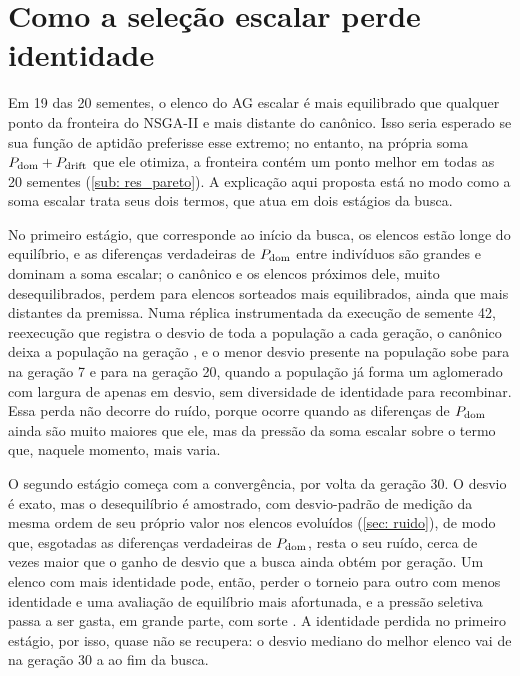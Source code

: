 \section{Como a seleção escalar perde identidade}
\label{sec: disc_ruido}

Em 19 das 20 sementes, o elenco do AG escalar é mais equilibrado que qualquer ponto da fronteira do NSGA-II e mais distante do canônico. Isso seria esperado se sua função de aptidão preferisse esse extremo; no entanto, na própria soma $P_{\mathrm{dom}} + P_{\mathrm{drift}}$ que ele otimiza, a fronteira contém um ponto melhor em todas as 20 sementes (\autoref{sub: res_pareto}). A explicação aqui proposta está no modo como a soma escalar trata seus dois termos, que atua em dois estágios da busca.

No primeiro estágio, que corresponde ao início da busca, os elencos estão longe do equilíbrio, e as diferenças verdadeiras de $P_{\mathrm{dom}}$ entre indivíduos são grandes e dominam a soma escalar; o canônico e os elencos próximos dele, muito desequilibrados, perdem para elencos sorteados mais equilibrados, ainda que mais distantes da premissa. Numa réplica instrumentada da execução de semente 42, reexecução que registra o desvio de toda a população a cada geração, o canônico deixa a população na geração \canonSaiGer{}, e o menor desvio presente na população sobe para \linhagemDriftSete{} na geração 7 e para \linhagemDriftVinte{} na geração 20, quando a população já forma um aglomerado com largura de apenas \linhagemLargura{} em desvio, sem diversidade de identidade para recombinar. Essa perda não decorre do ruído, porque ocorre quando as diferenças de $P_{\mathrm{dom}}$ ainda são muito maiores que ele, mas da pressão da soma escalar sobre o termo que, naquele momento, mais varia.

O segundo estágio começa com a convergência, por volta da geração 30. O desvio é exato, mas o desequilíbrio é amostrado, com desvio-padrão de medição da mesma ordem de seu próprio valor nos elencos evoluídos (\autoref{sec: ruido}), de modo que, esgotadas as diferenças verdadeiras de $P_{\mathrm{dom}}$, resta o seu ruído, cerca de \ruidoSobreGanho{} vezes maior que o ganho de desvio que a busca ainda obtém por geração. Um elenco com mais identidade pode, então, perder o torneio para outro com menos identidade e uma avaliação de equilíbrio mais afortunada, e a pressão seletiva passa a ser gasta, em grande parte, com sorte \cite{jin2005evolutionary}. A identidade perdida no primeiro estágio, por isso, quase não se recupera: o desvio mediano do melhor elenco vai de \trajDriftTrinta{} na geração 30 a \trajDriftFim{} ao fim da busca.

